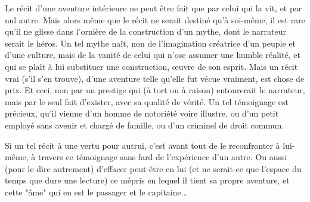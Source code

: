 Le récit d'une aventure intérieure ne peut être fait que par celui qui la vit, et par nul autre. Mais alors même que le récit ne serait destiné qu'à soi-même, il est rare qu'il ne glisse dans l'ornière de la construction d'un mythe, dont le narrateur serait le héros. Un tel mythe naît, non de l'imagination créatrice d'un peuple et d'une culture, mais de la vanité de celui qui n'ose assumer une humble réalité, et qui se plaît à lui substituer une construction, œuvre de son esprit. Mais un récit vrai (s'il s'en trouve), d'une aventure telle qu'elle fut vécue vraiment, est chose de prix. Et ceci, non par un prestige qui (à tort ou à raison) entourerait le narrateur, mais par le seul fait d'exister, avec sa qualité de vérité. Un tel témoignage est précieux, qu'il vienne d'un homme de notoriété voire illustre, ou d'un petit employé sans avenir et chargé de famille, ou d'un criminel de droit commun.

Si un tel récit à une vertu pour autrui, c'est avant tout de le reconfronter à lui-même, à travers ce témoignage sans fard de l'expérience d'un autre. Ou aussi (pour le dire autrement) d'effacer peut-être en lui (et ne serait-ce que l'espace du temps que dure une lecture) ce mépris en lequel il tient sa propre aventure, et cette "âme" qui en est le passager et le capitaine...


